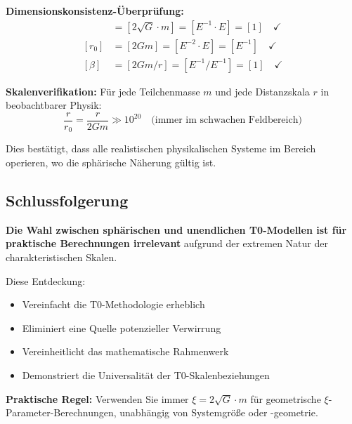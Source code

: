 \documentclass[12pt,a4paper]{article}
\begin{document}
\textbf{Dimensionskonsistenz-Überprüfung:}
\begin{align}
	[\xi] &= [2\sqrt{G} \cdot m] = [E^{-1} \cdot E] = [1] \quad \checkmark \\
	[r_0] &= [2Gm] = [E^{-2} \cdot E] = [E^{-1}] \quad \checkmark \\
	[\beta] &= [2Gm/r] = [E^{-1}/E^{-1}] = [1] \quad \checkmark
\end{align}

\textbf{Skalenverifikation:}
Für jede Teilchenmasse $m$ und jede Distanzskala $r$ in beobachtbarer Physik:
\begin{equation}
	\frac{r}{r_0} = \frac{r}{2Gm} \gg 10^{20} \quad \text{(immer im schwachen Feldbereich)}
\end{equation}

Dies bestätigt, dass alle realistischen physikalischen Systeme im Bereich operieren, wo die sphärische Näherung gültig ist.

\subsection{Schlussfolgerung}
\label{subsec:model_choice_conclusion}

\begin{tcolorbox}[colback=green!5!white,colframe=green!75!black,title=Schlüsselergebnis]
	\textbf{Die Wahl zwischen sphärischen und unendlichen T0-Modellen ist für praktische Berechnungen irrelevant} aufgrund der extremen Natur der charakteristischen Skalen.
	
	Diese Entdeckung:
	\begin{itemize}
		\item Vereinfacht die T0-Methodologie erheblich
		\item Eliminiert eine Quelle potenzieller Verwirrung
		\item Vereinheitlicht das mathematische Rahmenwerk
		\item Demonstriert die Universalität der T0-Skalenbeziehungen
	\end{itemize}
	
	\textbf{Praktische Regel:} Verwenden Sie immer $\xi = 2\sqrt{G} \cdot m$ für geometrische $\xi$-Parameter-Berechnungen, unabhängig von Systemgröße oder -geometrie.
\end{tcolorbox}
	
\end{document}
